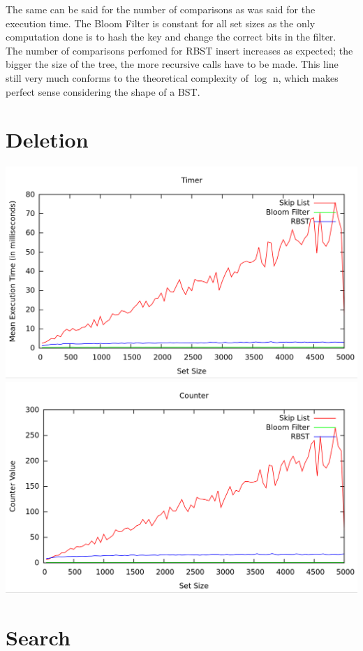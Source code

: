 \documentclass[11pt, notitlepage]{report}
\begin{document}
The same can be said for the number of comparisons as was said for the execution time. The Bloom Filter is constant for all set sizes as the only computation done is to hash the key and change the correct bits in the filter.\\

The number of comparisons perfomed for RBST insert increases as expected; the bigger the size of the tree, the more recursive calls have to be made. This line still very much conforms to the theoretical complexity of $\log$ n, which makes perfect sense considering the shape of a BST.

\section*{Deletion}

\includegraphics[width=\linewidth]{img/Timer-Del}
\includegraphics[width=\linewidth]{img/Counter-Del}

\section*{Search}
\end{document}
